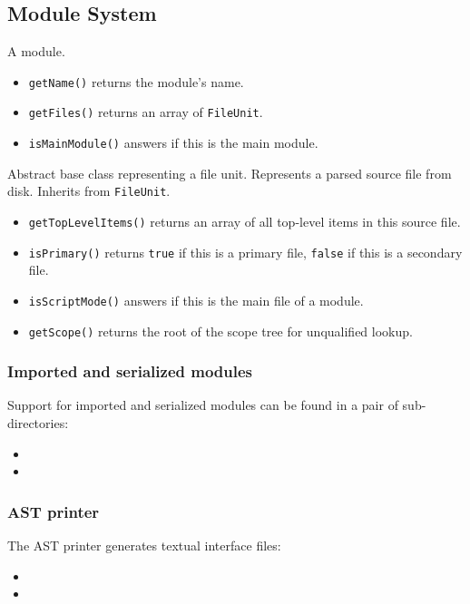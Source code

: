 \documentclass[../generics]{subfiles}
\begin{document}
\subsection*{Module System}
A module.
\begin{itemize}
\item \texttt{getName()} returns the module's name.
\item \texttt{getFiles()} returns an array of \texttt{FileUnit}.
\item \texttt{isMainModule()} answers if this is the main module.
\end{itemize}
Abstract base class representing a file unit.
Represents a parsed source file from disk. Inherits from \texttt{FileUnit}.
\begin{itemize}
\item \texttt{getTopLevelItems()} returns an array of all top-level items in this source file.
\item \texttt{isPrimary()} returns \texttt{true} if this is a primary file, \texttt{false} if this is a secondary file.
\item \texttt{isScriptMode()} answers if this is the main file of a module.
\item \texttt{getScope()} returns the root of the scope tree for unqualified lookup.
\end{itemize}

\subsubsection*{Imported and serialized modules}
Support for imported and serialized modules can be found in a pair of sub-directories:
\begin{itemize}
\item {}
\item {}
\end{itemize}

\subsubsection*{AST printer}
The AST printer generates textual interface files:
\begin{itemize}
\item {}
\item {}
\end{itemize}
\end{document}
